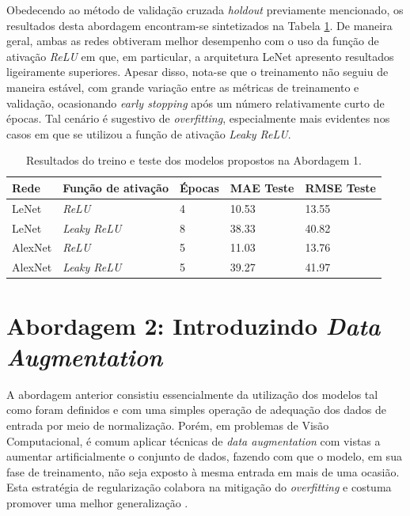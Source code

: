 	Obedecendo ao método de validação cruzada \emph{holdout} previamente mencionado, os resultados desta abordagem encontram-se sintetizados na Tabela \ref{tab:results-1}. De maneira geral, ambas as redes obtiveram melhor desempenho com o uso da função de ativação \emph{ReLU} em que, em particular,  a arquitetura LeNet apresento resultados ligeiramente superiores. Apesar disso, nota-se que o treinamento não seguiu de maneira estável, com grande variação entre as métricas de treinamento e validação, ocasionando \emph{early stopping} após um número relativamente curto de épocas. Tal cenário é sugestivo de \emph{overfitting}, especialmente mais evidentes nos casos em que se utilizou a função de ativação \emph{Leaky ReLU}.

  \begin{table}[!ht]
		\caption{Resultados do treino e teste dos modelos propostos na Abordagem 1.}
		\label{tab:results-1}
		\begin{center}
			\begin{tabular}{l l l l l}
				\toprule
				Rede & Função de ativação & Épocas & MAE Teste & RMSE Teste \\
				\midrule
				LeNet & \emph{ReLU}  & 4 & 10.53 & 13.55 \\
				LeNet & \emph{Leaky ReLU} & 8 & 38.33 & 40.82 \\
				AlexNet & \emph{ReLU}  & 5 & 11.03 & 13.76 \\
				AlexNet & \emph{Leaky ReLU} & 5 & 39.27 & 41.97 \\
				\bottomrule
			\end{tabular}
		\end{center}
	\end{table}

\section{Abordagem 2: Introduzindo \emph{Data Augmentation}}%

	A abordagem anterior consistiu essencialmente da utilização dos modelos tal como foram definidos e com uma simples operação de adequação dos dados de entrada por meio de normalização. Porém, em problemas de Visão Computacional, é comum aplicar técnicas de \emph{data augmentation} com vistas a aumentar artificialmente o conjunto de dados, fazendo com que o modelo, em sua fase de treinamento, não seja exposto à mesma entrada em mais de uma ocasião. Esta estratégia de regularização colabora na mitigação do \emph{overfitting} e costuma promover uma melhor generalização \cite{chollet2017deep}.

